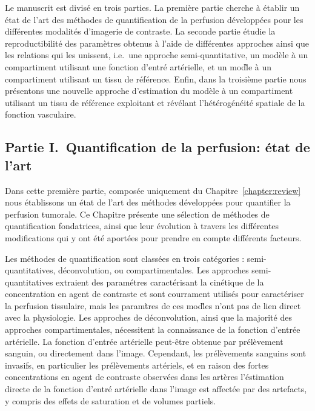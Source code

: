 \begin{otherlanguage}{francais}
Le manuscrit est divis\'e en trois parties.
La premi\`ere partie cherche \`a \'etablir un \'etat de l'art des m\'ethodes de quantification de la perfusion d\'evelopp\'ees pour les diff\'erentes modalit\'es d'imagerie de contraste.
La seconde partie \'etudie la reproductibilit\'e des param\`etres obtenus \`a l'aide de diff\'erentes approches ainsi que les relations qui les unissent, i.e.~une approche semi-quantitative, un mod\`ele \`a un compartiment utilisant une fonction d'entr\'e art\'erielle, et un mod\`le \`a un compartiment utilisant un tissu de r\'ef\'erence.
Enfin, dans la troisi\`eme partie nous pr\'esentons une nouvelle approche d'estimation du mod\`ele \`a un compartiment utilisant un tissu de r\'ef\'erence exploitant et r\'ev\'elant l'h\'et\'erog\'en\'eit\'e spatiale de la fonction vasculaire.

\subsection*{Partie I.~Quantification de la perfusion: \'etat de l'art}
Dans cette premi\`ere partie, compos\'ee uniquement du Chapitre~\ref{chapter:review} nous \'etablissons un \'etat de l'art des m\'ethodes d\'evelopp\'ees pour quantifier la perfusion tumorale.
Ce Chapitre pr\'esente une s\'election de m\'ethodes de quantification fondatrices, ainsi que leur \'evolution \`a travers les diff\'erentes modifications qui y ont \'et\'e aport\'ees pour prendre en compte diff\'erents facteurs. 

Les m\'ethodes de quantification sont class\'ees en trois cat\'egories : semi-quantitatives, d\'econvolution, ou compartimentales.
Les approches semi-quantitatives extraient des param\'etres caract\'erisant la cin\'etique de la concentration en agent de contraste et sont courrament utilis\'es pour caract\'eriser la perfusion tissulaire, mais les param\`tres de ces mod\`les n'ont pas de lien direct avec la physiologie.
Les approches de d\'econvolution, ainsi que la majorit\'e des approches compartimentales, n\'ecessitent la connaissance de la fonction d'entr\'ee art\'erielle.
La fonction d'entr\'ee art\'erielle peut-\^etre obtenue par pr\'el\`evement sanguin, ou directement dans l'image. 
Cependant, les pr\'el\`evements sanguins sont invasifs, en particulier les pr\'el\`evements art\'eriels, et en raison des fortes concentrations en agent de contraste observ\'ees dans les art\`eres l'\'estimation directe de la fonction d'entr\'e art\'erielle dans l'image est affect\'ee par des artefacts, y compris des effets de saturation et de volumes partiels.


\end{otherlanguage}

